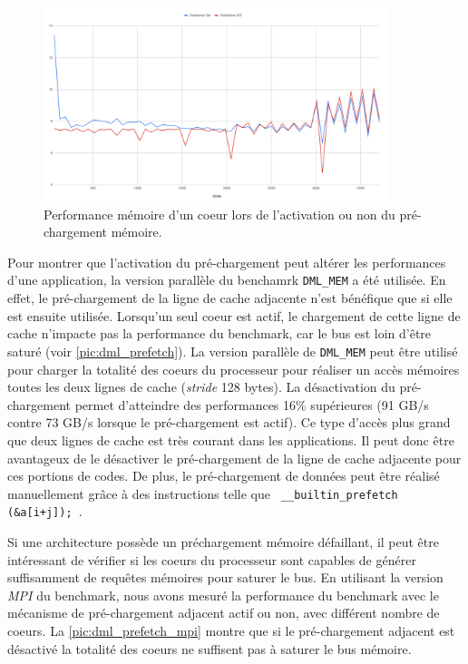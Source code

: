         \begin{figure}
        \center
        \includegraphics[width=10cm]{images/dml_prefetch.png}
        \caption{\label{pic:dml_prefetch} Performance mémoire d'un coeur lors de l'activation ou non du pré-chargement mémoire. }
        \end{figure}
         
        Pour montrer que l'activation du pré-chargement peut altérer les performances d'une application, la version parallèle du benchamrk \verb=DML_MEM= a été utilisée. En effet, le pré-chargement de la ligne de cache adjacente n'est bénéfique que si elle est ensuite utilisée. Lorsqu'un seul coeur est actif, le chargement de cette ligne de cache n'impacte pas la performance du benchmark, car le bus est loin d'être saturé (voir \autoref{pic:dml_prefetch}). La version parallèle de \verb=DML_MEM= peut être utilisé pour charger la totalité des coeurs du processeur pour réaliser un accès mémoires toutes les deux lignes de cache (\textit{stride} 128 bytes). La désactivation du pré-chargement permet d'atteindre des performances 16\% supérieures (91 GB/s contre 73 GB/s lorsque le pré-chargement est actif). Ce type d'accès plus grand que deux lignes de cache est très courant dans les applications. Il peut donc être avantageux de le désactiver le pré-chargement de la ligne de cache adjacente pour ces portions de codes. De plus, le pré-chargement de données peut être réalisé manuellement grâce à des instructions telle que \verb| __builtin_prefetch (&a[i+j]); |.

        Si une architecture possède un préchargement mémoire défaillant, il peut être intéressant de vérifier si les coeurs du processeur sont capables de générer suffisamment de requêtes mémoires pour saturer le bus. En utilisant la version \textit{MPI} du benchmark, nous avons mesuré la performance du benchmark avec le mécanisme de pré-chargement adjacent actif ou non, avec différent nombre de coeurs. La \autoref{pic:dml_prefetch_mpi} montre que si le pré-chargement adjacent est désactivé la totalité des coeurs ne suffisent pas à saturer le bus mémoire. 
        
